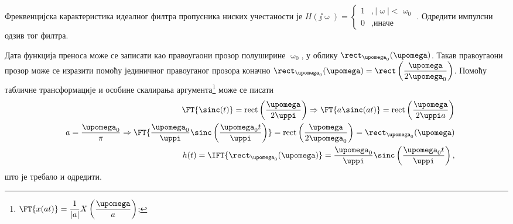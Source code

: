 \PID \label{z:lpf}
Фреквенцијска карактеристика идеалног филтра пропусника ниских учестаности је 
$H(\jj\upomega) = 
\begin{cases}
    1 &, |\upomega| < \upomega_0 \\
    0 &, \text{иначе}
\end{cases}.$ Одредити импулсни одзив тог филтра. 

\RESENJE 

Дата функција преноса може се записати као правоугаони прозор полуширине 
$\upomega_0$, у облику $\rect_{\upomega_0}(\upomega)$.
Такав правоугаони прозор може се изразити помоћу јединичног правоуганог прозора коначно
$\rect_{\upomega_0}(\upomega) = \rect \left( \dfrac{\upomega}{2\upomega_0} \right)$.
Помоћу табличне трансформације  и особине скалирања аргумента\footnote{
    $\FT{x(at)} = \dfrac{1}{|a|} X\left( \dfrac{\upomega}{a} \right)$;
} може се писати
\begin{eqnarray}
    && \FT{ \sinc(t) } = \mathrm{rect}\left(\frac{\upomega}{2\uppi}\right)
    \Rightarrow
    \FT{ a \sinc(at) } = \mathrm{rect}\left(\frac{\upomega}{2\uppi a}\right) \\ 
    && a = \dfrac{\upomega_0}{\pi} \Rightarrow
    \FT{ \dfrac{\upomega_0}{\uppi} \sinc \left( \dfrac{\upomega_0 t}{\uppi} \right) } = \mathrm{rect}\left(\frac{\upomega}{2 \upomega_0}\right) 
    =   \rect_{\upomega_0} (\upomega) \\ 
    && 
    h(t) 
    = 
    \IFT{ \rect_{\upomega_0} (\upomega)  } = \dfrac{\upomega_0}{\uppi} \sinc \left( \dfrac{\upomega_0 t}{\uppi} \right),
\end{eqnarray}
што је требало и одредити. 
